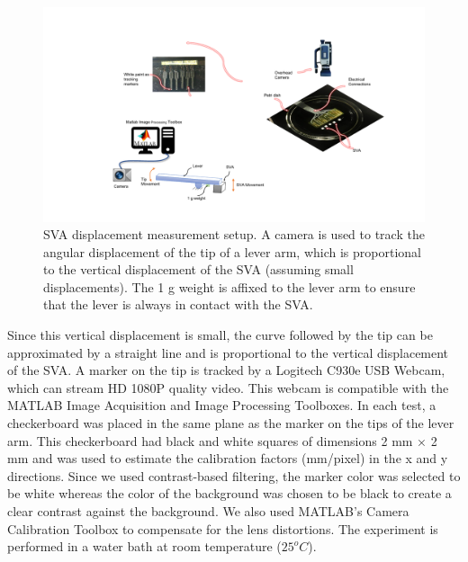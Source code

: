 \begin{figure}[!h]
      \centering
      \includegraphics[width=\textwidth]{swellingTestSetup.pdf}
      \caption{SVA displacement measurement setup. A camera is used to track the angular displacement of the tip of a lever arm, which is proportional to the vertical displacement of the SVA (assuming small displacements). The 1 g weight is affixed to the lever arm to ensure that the lever is always in contact with the SVA.}
      \label{fig:swellingTestSetup}
\end{figure}

Since this vertical displacement is small, the curve followed by the tip can be approximated by a straight line and is proportional to the vertical displacement of the SVA. A marker on the tip is tracked by a Logitech C930e USB Webcam, which can stream HD 1080P quality video. This webcam is compatible with the MATLAB Image Acquisition and Image Processing Toolboxes. In each test, a checkerboard was placed in the same plane as the marker on the tips of the lever arm. This checkerboard had black and white squares of dimensions 2 mm × 2 mm and was used to estimate the calibration factors (mm/pixel) in the x and y directions. Since we used contrast-based filtering, the marker color was selected to be white whereas the color of the background was chosen to be black to create a clear contrast against the background. We also used MATLAB’s Camera Calibration Toolbox to compensate for the lens distortions. The experiment is performed in a water bath at room temperature ($25^{o}C$).



